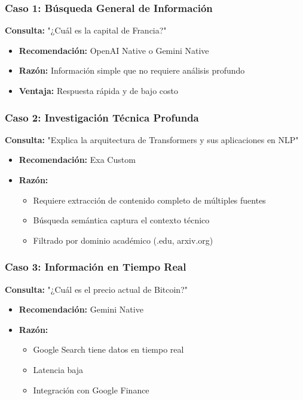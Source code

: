 \documentclass[12pt,a4paper]{article}
\begin{document}
\subsubsection{Caso 1: Búsqueda General de Información}

\textbf{Consulta:} "¿Cuál es la capital de Francia?"

\begin{itemize}
    \item \textbf{Recomendación:} OpenAI Native o Gemini Native
    \item \textbf{Razón:} Información simple que no requiere análisis profundo
    \item \textbf{Ventaja:} Respuesta rápida y de bajo costo
\end{itemize}

\subsubsection{Caso 2: Investigación Técnica Profunda}

\textbf{Consulta:} "Explica la arquitectura de Transformers y sus aplicaciones en NLP"

\begin{itemize}
    \item \textbf{Recomendación:} Exa Custom
    \item \textbf{Razón:}
    \begin{itemize}
        \item Requiere extracción de contenido completo de múltiples fuentes
        \item Búsqueda semántica captura el contexto técnico
        \item Filtrado por dominio académico (.edu, arxiv.org)
    \end{itemize}
\end{itemize}

\subsubsection{Caso 3: Información en Tiempo Real}

\textbf{Consulta:} "¿Cuál es el precio actual de Bitcoin?"

\begin{itemize}
    \item \textbf{Recomendación:} Gemini Native
    \item \textbf{Razón:}
    \begin{itemize}
        \item Google Search tiene datos en tiempo real
        \item Latencia baja
        \item Integración con Google Finance
    \end{itemize}
\end{itemize}
\end{document}
